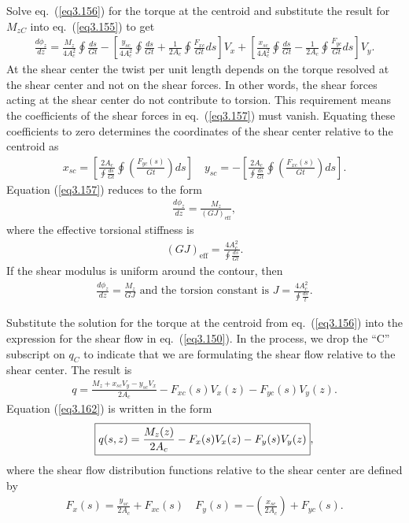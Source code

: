 \documentclass{AeroStructure-ERJohnson}
\begin{document}
\noindent Solve eq.~(\ref{eq3.156}) for the torque at the centroid and substitute the result for $M_{zC}$ into eq.~(\ref{eq3.155}) to get
\begin{align}\label{eq3.157}
\frac{d \phi_{z}}{d z}=\frac{M_{z}}{4 A_{c}^{2}} \oint \frac{d s}{G t}-\left[\frac{y_{s c}}{4 A_{c}^{2}} \oint \frac{d s}{G t}+\frac{1}{2 A_{c}} \oint \frac{F_{x c}}{G t} d s\right] V_{x}+\left[\frac{x_{s c}}{4 A_{c}^{2}} \oint \frac{d s}{G t}-\frac{1}{2 A_{c}} \oint \frac{F_{y c}}{G t} d s\right] V_{y}.
\end{align}
At the shear center the twist per unit length depends on the torque resolved at the shear center and not on the shear forces. In other words, the shear forces acting at the shear center do not contribute to torsion. This requirement means the coefficients of the shear forces in eq.~(\ref{eq3.157}) must vanish. Equating these coefficients to zero determines the coordinates of the shear center relative to the centroid as
\begin{align}\label{eq3.158}
x_{s c}=\left[\frac{2 A_{c}}{\oint \frac{d s}{G t}} \oint\left(\frac{F_{y c}(s)}{G t}\right) d s\right] \quad y_{s c}=-\left[\frac{2 A_{c}}{\oint \frac{d s}{G t}} \oint\left(\frac{F_{x c}(s)}{G t}\right) d s\right].
\end{align}
Equation (\ref{eq3.157}) reduces to the form
\begin{align}\label{eq3.159}
\frac{d \phi_{z}}{d z}=\frac{M_{z}}{(G J)_{\mathrm{eff}}},
\end{align}
where the effective torsional stiffness is
\begin{align}\label{eq3.160}
(G J)_{\mathrm{eff}}=\frac{4 A_{c}^{2}}{\oint \frac{d s}{G t}}.
\end{align}
If the shear modulus is uniform around the contour, then
\begin{align}\label{eq3.161}
\frac{d \phi_{z}}{d z}=\frac{M_{z}}{G J}\mbox{ and the torsion constant is }J=\frac{4 A_{c}^{2}}{\oint \frac{d s}{t}}.
\end{align}

Substitute the solution for the torque at the centroid from eq.~(\ref{eq3.156}) into the expression for the shear flow in eq.~(\ref{eq3.150}). In the process, we drop the ``C'' subscript on $q_C$ to indicate that we are formulating the shear flow relative to the shear center. The result is
\begin{align}\label{eq3.162}
q=\frac{M_{z}+x_{s c} V_{y}-y_{s c} V_{x}}{2 A_{c}}-F_{x c}(s) V_{x}(z)-F_{y c}(s) V_{y}(z).
\end{align}
Equation (\ref{eq3.162}) is written in the form
\begin{align}\label{eq3.163}
\fbox{$\displaystyle q(s, z)=\frac{M_{z}(z)}{2 A_{c}}-F_{x}(s) V_{x}(z)-F_{y}(s) V_{y}(z)$},
\end{align}
where the shear flow distribution functions relative to the shear center are defined by
\begin{align}\label{eq3.164}
F_{x}(s)=\frac{y_{s c}}{2 A_{c}}+F_{x c}(s) \quad F_{y}(s)=-\left(\frac{x_{s c}}{2 A_{c}}\right)+F_{y c}(s).
\end{align}
\end{document}
